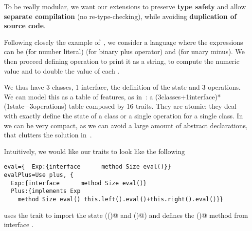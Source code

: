 To be really modular, we want our extensions to
preserve \textbf{type safety}
and allow \textbf{separate compilation} (no re-type-checking),
while avoiding \textbf{duplication of source code}.

Following closely
the example of~\cite{},
we consider a language where the
expressions \Q@Exp@ can
be \Q@Num@ (for number literal)
\Q@Plus@ (for binary plus operator)
and \Q@Neg@ (for unary minus).
We then proceed defining operation
\Q@show@ to print it as a string,
 \Q@eval@ to compute the numeric value and 
\Q@double@ to double the value of each \Q@Num@.

We thus have 3 classes, 1 interface,
the definition of the state and 3 operations.
We can model this
as a table of features, as in~\cite{Deepfjig}:
a (3classes+1interface)*(1state+3operations)
table composed by 16 traits.
They are atomic: they deal with exactly 
define the state of a class
or a single operation for a single class.
In \name we can be very compact,
 as we can avoid a large amount of abstract declarations,
that clutters the solution in~\cite{Deepfjig}.

Intuitively, we would like our traits to look like the following 
\begin{lstlisting}
eval={  Exp:{interface      method Size eval()}}
evalPlus=Use plus, {  
  Exp:{interface      method Size eval()}
  Plus:{implements Exp
    method Size eval() this.left().eval()+this.right().eval()}}
\end{lstlisting}
\Q@basePlus@ uses the trait \Q@plus@ to import the state (\Q@left()@ and \Q@right()@)
and defines the \Q@eval()@ method from interface \Q@Exp@.

